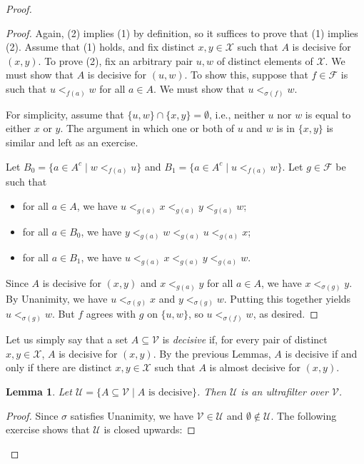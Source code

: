 \documentclass[a4paper]{memoir}
\newtheorem{lemma}[theorem]{Lemma}
\theoremstyle{definition}
\newcommand{\mc}{\mathcal}
\begin{document}
\begin{proof}
  \begin{proof}
    Again, (2) implies (1) by definition, so it suffices to prove that (1) implies (2). 
    Assume that (1) holds, and fix distinct $x,y \in \mc{X}$ such that $A$ is decisive 
    for $(x,y)$. To prove (2), fix an arbitrary pair $u,w$ of distinct elements of $\mc{X}$. 
    We must show that $A$ is decisive for $(u,w)$. To show this, suppose that 
    $f \in \mc{F}$ is such that $u <_{f(a)} w$ for all $a \in A$. We must show that 
    $u <_{\sigma(f)} w$.
    
    For simplicity, assume that $\{u,w\} \cap \{x,y\} = \emptyset$, i.e., neither $u$ nor 
    $w$ is equal to either $x$ or $y$. The argument in which one or both of $u$ and $w$ 
    is in $\{x,y\}$ is similar and left as an exercise. 
    
    Let $B_0 = \{a \in A^c \mid w <_{f(a)} u\}$ and $B_1 = \{a \in A^c \mid u <_{f(a)} w\}$. 
    Let $g \in \mc{F}$ be such that 
    \begin{itemize}
      \item for all $a \in A$, we have $u <_{g(a)} x <_{g(a)} y <_{g(a)} w$;
      \item for all $a \in B_0$, we have $y <_{g(a)} w <_{g(a)} u <_{g(a)} x$;
      \item for all $a \in B_1$, we have $u <_{g(a)} x <_{g(a)} y <_{g(a)} w$.
    \end{itemize}
    Since $A$ is decisive for $(x,y)$ and $x <_{g(a)} y$ for all $a \in A$, we have 
    $x <_{\sigma(g)} y$. By Unanimity, we have $u <_{\sigma(g)} x$ and $y <_{\sigma(g)} w$. 
    Putting this together yields $u <_{\sigma(g)} w$. But $f$ agrees with $g$ on $\{u,w\}$, 
    so $u <_{\sigma(f)} w$, as desired.
  \end{proof}
  
  Let us simply say that a set $A \subseteq \mc{V}$ is \emph{decisive} if, for every pair of 
  distinct $x,y \in \mc{X}$, $A$ is decisive for $(x,y)$. By the previous Lemmas, $A$ is 
  decisive if and only if there are distinct $x,y \in \mc{X}$ such that $A$ is almost decisive 
  for $(x,y)$.
  
  \begin{lemma}
    Let $\mc{U} = \{A \subseteq \mc{V} \mid A \text{ is decisive}\}$. Then $\mc{U}$ is an ultrafilter 
    over $\mc{V}$.
  \end{lemma}
  
  \begin{proof}
    Since $\sigma$ satisfies Unanimity, we have $\mc{V} \in \mc{U}$ and $\emptyset \notin \mc{U}$. 
    The following exercise shows that $\mc{U}$ is closed upwards:
    

\end{proof}
\end{proof}
\end{document}
